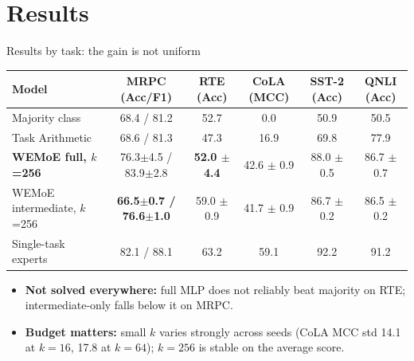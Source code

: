 \section{Results}

\begin{frame}{Results by task: the gain is not uniform}
  \centering
  \footnotesize
  \renewcommand{\arraystretch}{1.3}\begin{tabular}{|l|c|c|c|c|c|}
    \hline
    \textbf{Model} & \textbf{MRPC (Acc/F1)} & \textbf{RTE (Acc)} & \textbf{CoLA (MCC)} & \textbf{SST-2 (Acc)} & \textbf{QNLI (Acc)}\\ \hline
    Majority class & 68.4 / 81.2 & 52.7 & 0.0 & 50.9 & 50.5\\ \hline
    Task Arithmetic & 68.6 / 81.3 & 47.3 & 16.9 & 69.8 & 77.9\\ \hline
    \textbf{WEMoE full, $k$=256} & 76.3$\pm$4.5 / 83.9$\pm$2.8 & \textbf{52.0 $\pm$ 4.4} & 42.6 $\pm$ 0.9 & 88.0 $\pm$ 0.5 & 86.7 $\pm$ 0.7\\ \hline
    WEMoE intermediate, $k$=256 & \textbf{66.5$\pm$0.7 / 76.6$\pm$1.0} & 59.0 $\pm$ 0.9 & 41.7 $\pm$ 0.9 & 86.7 $\pm$ 0.2 & 86.5 $\pm$ 0.2\\ \hline
    Single-task experts & 82.1 / 88.1 & 63.2 & 59.1 & 92.2 & 91.2\\ \hline
  \end{tabular}
  \vfill
  \raggedright
  \begin{itemize}\footnotesize
    \item \textbf{Not solved everywhere:} full MLP does not reliably beat majority on RTE; intermediate-only falls below it on MRPC.
    \item \textbf{Budget matters:} small $k$ varies strongly across seeds (CoLA MCC std 14.1 at $k=16$, 17.8 at $k=64$); $k=256$ is stable on the average score.
  \end{itemize}
\end{frame}

